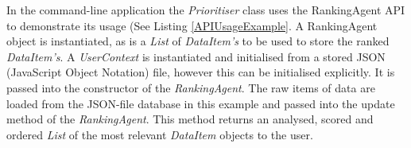 In the command-line application the \emph{Prioritiser} class uses the RankingAgent API to demonstrate its usage (See Listing \ref{APIUsageExample}. A RankingAgent object is instantiated, as is a \emph{List} of \emph{DataItem's} to be used to store the ranked \emph{DataItem's}. A \emph{UserContext} is instantiated and initialised from a stored JSON (JavaScript Object Notation) file, however this can be initialised explicitly. It is passed into the constructor of the \emph{RankingAgent}. The raw items of data are loaded from the JSON-file database in this example and passed into the update method of the \emph{RankingAgent}. This method returns an analysed, scored and ordered \emph{List} of the most relevant \emph{DataItem} objects to the user. 



